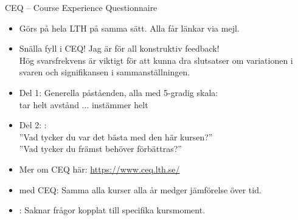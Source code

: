 

\begin{Slide}{CEQ -- Course Experience Questionnaire}\SlideFontSmall
\begin{itemize}
\item Görs på hela LTH på samma sätt. Alla får länkar via mejl.
\item Snälla fyll i CEQ! Jag är  för all konstruktiv feedback! \\ Hög svarsfrekvens är viktigt för att kunna dra slutsatser om variationen i svaren och signifikansen i sammanställningen.
\item Del 1: Generella påståenden, alla med 5-gradig skala: \\ tar helt avstånd ... instämmer helt
\item Del 2: : \\
''Vad  tycker  du  var  det  bästa  med  den här  kursen?'' \\
''Vad  tycker  du  främst  behöver  förbättras?''
\item Mer om CEQ här: \url{https://www.ceq.lth.se/}
\item {} med CEQ: Samma alla kurser alla år medger jämförelse över tid.
\item {}: Saknar frågor kopplat till specifika kursmoment.
\end{itemize}
\end{Slide}

